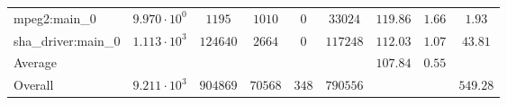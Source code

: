 \begin{tabular}{|l|c|c|c|c|c|c|c|c|}
mpeg2:main\_0           & $ 9.970 \cdot 10^{0} $ & $ 1195   $ & $ 1010  $ & $ 0   $ & $ 33024  $ & $ 119.86      $ & $ 1.66    $ & $ 1.93    $ \\
sha\_driver:main\_0     & $ 1.113 \cdot 10^{3} $ & $ 124640 $ & $ 2664  $ & $ 0   $ & $ 117248 $ & $ 112.03      $ & $ 1.07    $ & $ 43.81   $ \\
\hline
Average                 & $                    $ & $        $ & $       $ & $     $ & $        $ & $ 107.84      $ & $ 0.55    $ & $         $ \\
\hline
Overall                 & $ 9.211 \cdot 10^{3} $ & $ 904869 $ & $ 70568 $ & $ 348 $ & $ 790556 $ & $             $ & $         $ & $ 549.28  $ \\
\hline
\end{tabular}
